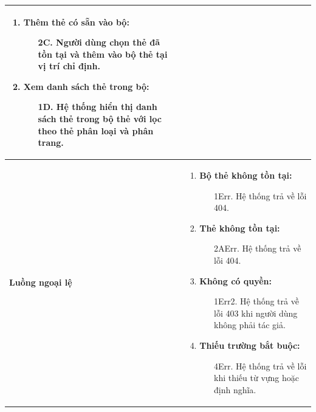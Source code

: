 {\begin{tabularx}{\textwidth}{|>{\raggedright\arraybackslash}X|>{\raggedright\arraybackslash}X|}
\begin{enumerate}
\begin{enumerate}
    \end{enumerate}
    \item \textbf{Thêm thẻ có sẵn vào bộ:}
    \begin{enumerate}
        \item[2C.] Người dùng chọn thẻ đã tồn tại và thêm vào bộ thẻ tại vị trí chỉ định.
    \end{enumerate}
    \item \textbf{Xem danh sách thẻ trong bộ:}
    \begin{enumerate}
        \item[1D.] Hệ thống hiển thị danh sách thẻ trong bộ thẻ với lọc theo thẻ phân loại và phân trang.
    \end{enumerate}
\end{enumerate} \\
\hline
\textbf{Luồng ngoại lệ} &
\begin{enumerate}
    \item \textbf{Bộ thẻ không tồn tại:}
    \begin{enumerate}
        \item[1Err.] Hệ thống trả về lỗi 404.
    \end{enumerate}
    \item \textbf{Thẻ không tồn tại:}
    \begin{enumerate}
        \item[2AErr.] Hệ thống trả về lỗi 404.
    \end{enumerate}
    \item \textbf{Không có quyền:}
    \begin{enumerate}
        \item[1Err2.] Hệ thống trả về lỗi 403 khi người dùng không phải tác giả.
    \end{enumerate}
    \item \textbf{Thiếu trường bắt buộc:}
    \begin{enumerate}
        \item[4Err.] Hệ thống trả về lỗi khi thiếu từ vựng hoặc định nghĩa.
    \end{enumerate}
\end{enumerate} \\
\hline
\end{tabularx}
}
